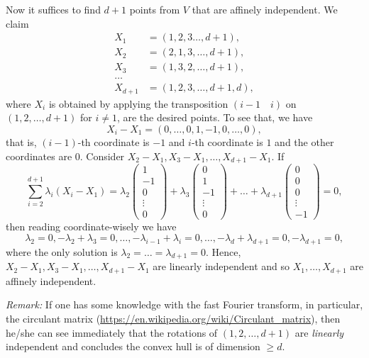 \documentclass[12pt,reqno]{amsart}
\theoremstyle{definition}
\begin{document}
Now it suffices to find $d+1$ points from $V$ that are affinely independent. We claim \begin{align*}
  X_1     & = (1,2,3\dots,d+1),    \\
  X_2     & = (2,1,3,\dots,d+1),   \\
  X_3     & = (1,3,2,\dots,d+1),   \\
  \dots   &                        \\
  X_{d+1} & = (1,2,3,\dots,d+1,d),
\end{align*} where $X_i$ is obtained by applying the transposition $(i-1\quad i)$ on $(1,2,\dots,d+1)$ for $i\not=1$, are the desired points. To see that, we have $$X_i - X_1 = (0,\dots,0,1,-1,0,\dots,0),$$ that is, $(i-1)$-th coordinate is $-1$ and $i$-th coordinate is $1$ and the other coordinates are 0. Consider $X_2-X_1,X_3-X_1,\dots,X_{d+1}-X_1$. If $$\sum_{i=2}^{d+1}\lambda_i(X_i-X_1) = \lambda_2 \begin{pmatrix}
    1      \\
    -1     \\
    0      \\
    \vdots \\
    0
  \end{pmatrix} + \lambda_3  \begin{pmatrix}
    0      \\
    1      \\
    -1     \\
    \vdots \\
    0
  \end{pmatrix}  + \dots+ \lambda_{d+1} \begin{pmatrix}
    0      \\
    0      \\
    0      \\
    \vdots \\
    -1
  \end{pmatrix}  =0,$$ then reading coordinate-wisely we have \[\lambda_2 = 0, -\lambda_2+\lambda_3=0, \dots, -\lambda_{i-1}+\lambda_{i}=0,\dots, -\lambda_{d}+\lambda_{d+1} = 0, -\lambda_{d+1}=0, \] where the only solution is $\lambda_2=\dots=\lambda_{d+1}=0$. Hence, $X_2-X_1,X_3-X_1,\dots,X_{d+1}-X_1$ are linearly independent and so $X_1,\dots,X_{d+1}$ are affinely independent.

\emph{Remark:} If one has some knowledge with the fast Fourier transform, in particular, the circulant matrix (\url{https://en.wikipedia.org/wiki/Circulant_matrix}), then he/she can see immediately that the rotations of $(1,2,\dots,d+1)$ are \emph{linearly} independent and concludes the convex hull is of dimension $\geq d$.\\
\end{document}
